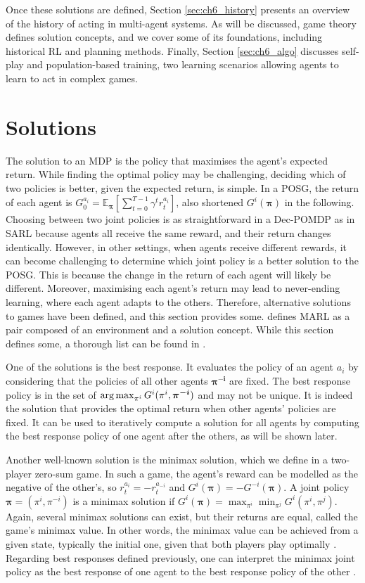 Once these solutions are defined, Section \ref{sec:ch6_history} presents an overview of the history of acting in multi-agent systems.
As will be discussed, game theory defines solution concepts, and we cover some of its foundations, including historical RL and planning methods.
Finally, Section \ref{sec:ch6_algo} discusses self-play and population-based training, two learning scenarios allowing agents to learn to act in complex games.

\section{Solutions}\label{sec:ch6_solutions}
The solution to an MDP is the policy that maximises the agent's expected return.
While finding the optimal policy may be challenging, deciding which of two policies is better, given the expected return, is simple.
In a POSG, the return of each agent is $G_0^{a_i} = \mathbb{E}_{\mathbf{\pi}}\left[ \sum_{t=0}^{T-1} \gamma^t r^{a_i}_t \right]$, also shortened $G^i(\mathbf{\pi})$ in the following.
Choosing between two joint policies is as straightforward in a Dec-POMDP as in SARL because agents all receive the same reward, and their return changes identically.
However, in other settings, when agents receive different rewards, it can become challenging to determine which joint policy is a better solution to the POSG.
This is because the change in the return of each agent will likely be different.
Moreover, maximising each agent's return may lead to never-ending learning, where each agent adapts to the others.
Therefore, alternative solutions to games have been defined, and this section provides some.
\cite{marl-book} defines MARL as a pair composed of an environment and a solution concept.
While this section defines some, a thorough list can be found in \citep{marl-book}.

One of the solutions is the best response.
It evaluates the policy of an agent $a_i$ by considering that the policies of all other agents $\mathbf{\pi^{-i}}$ are fixed.
The best response policy is in the set of $\argmax_{\pi^{i}} G^i (\pi^{i}, \mathbf{\pi^{-i}})$ and may not be unique.
It is indeed the solution that provides the optimal return when other agents' policies are fixed.
It can be used to iteratively compute a solution for all agents by computing the best response policy of one agent after the others, as will be shown later.

Another well-known solution is the minimax solution, which we define in a two-player zero-sum game.
In such a game, the agent's reward can be modelled as the negative of the other's, so $r_t^{a_i} = -r_t^{a_{-i}}$ and $G^i(\mathbf{\pi}) = - G^{-i}(\mathbf{\pi})$.
A joint policy $\mathbf{\pi} = (\pi^i, \pi^{-i})$ is a minimax solution if $G^i(\mathbf{\pi})=\max_{\pi^i} \min_{\pi^j} G^i(\pi^i, \pi^j)$.
Again, several minimax solutions can exist, but their returns are equal, called the game's minimax value.
In other words, the minimax value can be achieved from a given state, typically the initial one, given that both players play optimally \citep{russel2010}.
Regarding best responses defined previously, one can interpret the minimax joint policy as the best response of one agent to the best response policy of the other \citep{marl-book}.

